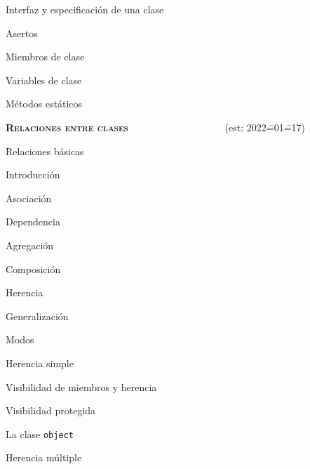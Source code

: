 \begin{longenum}
\begin{longenum}
\begin{longenum}
\begin{longenum}
                \item Interfaz y especificación de una clase
                \item Asertos
            \end{longenum}
        \end{longenum}
        \item Miembros de clase
        \begin{longenum}
            \item Variables de clase
            \item Métodos estáticos
        \end{longenum}
    \end{longenum}
    \item \textbf{\textsc{Relaciones entre clases}} \ \ \ \ \ \ \ \ \ \ \ \ \ \ \ \ \ \ \ (est: 2022\==01\==17)
    \begin{longenum}
        \item Relaciones básicas
        \begin{longenum}
            \item Introducción
            \item Asociación
            \item Dependencia
            \item Agregación
            \item Composición
        \end{longenum}
        \item Herencia
        \begin{longenum}
            \item Generalización
            \item Modos
            \begin{longenum}
                \item Herencia simple
                \item Visibilidad de miembros y herencia
                \begin{longenum}
                    \item Visibilidad protegida
                \end{longenum}
                \item La clase \texttt{object}
                \item Herencia múltiple
            \end{longenum}
        \end{longenum}

\end{longenum}
\end{longenum}
